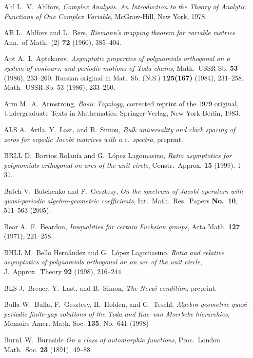 \documentclass[reqno,centertags, 12pt]{amsart}
\numberwithin{equation}{section}
\theoremstyle{definition}
\begin{document}
\begin{thebibliography}{999}

{\bibitem}{Ahl} L.~V.~Ahlfors, \textit{Complex Analysis. An Introduction to
the Theory of Analytic Functions of One Complex Variable},
McGraw-Hill, New York, 1978.

{\bibitem}{AB} L.~Ahlfors and L.~Bers, {\it Riemann's mapping theorem for
variable metrics} Ann.\ of Math.\ (2) {\bf 72} (1960), 385--404.

{\bibitem}{Apt} A.~I.~Aptekarev, \emph{Asymptotic properties of polynomials
orthogonal on a system of contours, and periodic motions of Toda
chains}, Math.\ USSR Sb. {\bf 53} (1986), 233--260; Russian original
in Mat.\ Sb. (N.S.) {\bf 125(167)} (1984), 231--258. Math.\ USSR-Sb.
53 (1986), 233--260. 

{\bibitem}{Arm} M.~A.~Armstrong, \textit{Basic Topology}, corrected reprint
of the 1979 original, Undergraduate Texts in Mathematics,
Springer-Verlag, New York-Berlin, 1983.

{\bibitem}{ALS} A.~Avila, Y.~Last, and B.~Simon, {\it Bulk universality and
clock spacing of zeros for ergodic Jacobi matrices with a.c.\
spectra}, preprint.

{\bibitem}{BRLL} D.~Barrios Rolan\'ia and G.~L\'opez Lagomasino, {\it Ratio
asymptotics for polynomials orthogonal on arcs of the unit circle},
Constr.\ Approx. {\bf 15} (1999), 1--31.

{\bibitem}{Batch} V.~Batchenko and F.~Gesztesy, {\it On the spectrum of
Jacobi operators with quasi-periodic algebro-geometric
coefficients}, Int.\ Math.\ Res.\ Papers {\bf No.\ 10}, 511--563
(2005).

{\bibitem}{Bear} A.~F.~Beardon, {\it Inequalities for certain Fuchsian
groups}, Acta Math. {\bf 127} (1971), 221--258.

{\bibitem}{BHLL} M.~Bello Hern\'andez  and G.~L\'opez Lagomasino, {\it
Ratio and relative asymptotics of polynomials orthogonal on an arc
of the unit circle}, J.\ Approx.\ Theory {\bf 92} (1998),  216--244.

{\bibitem}{BLS} J.~Breuer, Y.~Last, and B.~Simon, {\it The Nevai
condition}, preprint.

{\bibitem}{Bulla} W.~Bulla, F.~Gesztesy, H.~Holden, and G.~Teschl, {\it
Algebro-geometric quasi-periodic finite-gap solutions of the Toda
and Kac--van Moerbeke hierarchies}, Memoirs Amer. Math. Soc. {\bf
135}, No.\ 641 (1998)

{\bibitem}{Burn1} W.~Burnside {\it On a class of automorphic functions},
Proc.\ London Math.\ Soc. {\bf 23} (1891), 49--88


\end{thebibliography}
\end{document}
